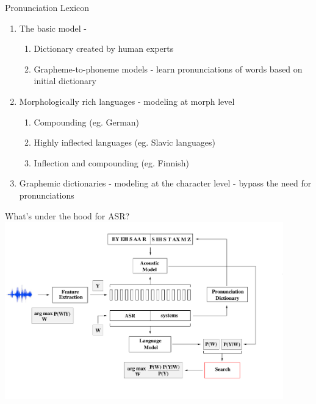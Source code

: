 \begin{frame}{Pronunciation Lexicon}
\begin{enumerate}
\item The \alert{basic} model \cite{fosler2003tutorial,bisani2008joint,hain2002implicit}-
\begin{enumerate}
\item Dictionary created by human experts
\item Grapheme-to-phoneme models - learn pronunciations of words based on initial dictionary
\end{enumerate}
\item \alert{Morphologically rich languages} - modeling at morph level
\begin{enumerate}
\item Compounding (eg. German)
\item Highly inflected languages (eg. Slavic languages)
\item Inflection and compounding (eg. Finnish)
\end{enumerate}
\item \alert{Graphemic dictionaries} - modeling at the character level - bypass the need for pronunciations
\end{enumerate}
\end{frame}

\begin{frame}{What's under the hood for ASR?}
\includegraphics[height=77mm]{figures/b5}
\end{frame}

